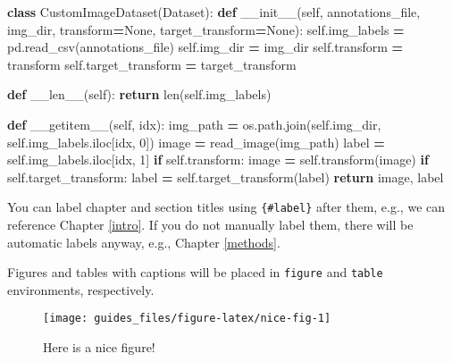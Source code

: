 \documentclass[
]{book}
\newenvironment{Shaded}{\begin{snugshade}}{\end{snugshade}}
\newcommand{\BuiltInTok}[1]{#1}
\newcommand{\ControlFlowTok}[1]{\textcolor[rgb]{0.13,0.29,0.53}{\textbf{#1}}}
\newcommand{\DecValTok}[1]{\textcolor[rgb]{0.00,0.00,0.81}{#1}}
\newcommand{\FunctionTok}[1]{\textcolor[rgb]{0.00,0.00,0.00}{#1}}
\newcommand{\KeywordTok}[1]{\textcolor[rgb]{0.13,0.29,0.53}{\textbf{#1}}}
\newcommand{\NormalTok}[1]{#1}
\newcommand{\OperatorTok}[1]{\textcolor[rgb]{0.81,0.36,0.00}{\textbf{#1}}}
\newcommand{\VariableTok}[1]{\textcolor[rgb]{0.00,0.00,0.00}{#1}}
\begin{document}
\begin{Shaded}
\begin{Highlighting}[]
\KeywordTok{class}\NormalTok{ CustomImageDataset(Dataset):}
    \KeywordTok{def} \FunctionTok{\_\_init\_\_}\NormalTok{(}\VariableTok{self}\NormalTok{, annotations\_file, img\_dir, transform}\OperatorTok{=}\VariableTok{None}\NormalTok{, target\_transform}\OperatorTok{=}\VariableTok{None}\NormalTok{):}
        \VariableTok{self}\NormalTok{.img\_labels }\OperatorTok{=}\NormalTok{ pd.read\_csv(annotations\_file)}
        \VariableTok{self}\NormalTok{.img\_dir }\OperatorTok{=}\NormalTok{ img\_dir}
        \VariableTok{self}\NormalTok{.transform }\OperatorTok{=}\NormalTok{ transform}
        \VariableTok{self}\NormalTok{.target\_transform }\OperatorTok{=}\NormalTok{ target\_transform}

    \KeywordTok{def} \FunctionTok{\_\_len\_\_}\NormalTok{(}\VariableTok{self}\NormalTok{):}
        \ControlFlowTok{return} \BuiltInTok{len}\NormalTok{(}\VariableTok{self}\NormalTok{.img\_labels)}

    \KeywordTok{def} \FunctionTok{\_\_getitem\_\_}\NormalTok{(}\VariableTok{self}\NormalTok{, idx):}
\NormalTok{        img\_path }\OperatorTok{=}\NormalTok{ os.path.join(}\VariableTok{self}\NormalTok{.img\_dir, }\VariableTok{self}\NormalTok{.img\_labels.iloc[idx, }\DecValTok{0}\NormalTok{])}
\NormalTok{        image }\OperatorTok{=}\NormalTok{ read\_image(img\_path)}
\NormalTok{        label }\OperatorTok{=} \VariableTok{self}\NormalTok{.img\_labels.iloc[idx, }\DecValTok{1}\NormalTok{]}
        \ControlFlowTok{if} \VariableTok{self}\NormalTok{.transform:}
\NormalTok{            image }\OperatorTok{=} \VariableTok{self}\NormalTok{.transform(image)}
        \ControlFlowTok{if} \VariableTok{self}\NormalTok{.target\_transform:}
\NormalTok{            label }\OperatorTok{=} \VariableTok{self}\NormalTok{.target\_transform(label)}
        \ControlFlowTok{return}\NormalTok{ image, label}
  
\end{Highlighting}
\end{Shaded}

You can label chapter and section titles using \texttt{\{\#label\}} after them, e.g., we can reference Chapter \ref{intro}. If you do not manually label them, there will be automatic labels anyway, e.g., Chapter \ref{methods}.

Figures and tables with captions will be placed in \texttt{figure} and \texttt{table} environments, respectively.

\begin{figure}

{\centering \texttt{[image: guides\_files/figure-latex/nice-fig-1]} 

}

\caption{Here is a nice figure!}\label{fig:nice-fig}
\end{figure}
\end{document}
